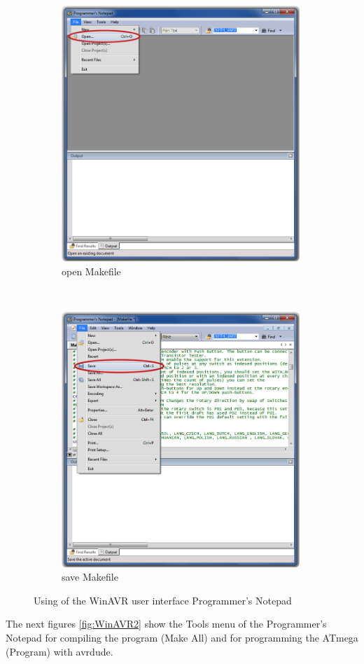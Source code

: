 \begin{figure}[H]
  \begin{subfigure}[b]{9cm}
    \centering
    \includegraphics[width=9cm]{../PNG/Notepad_open.png}
    \caption{open Makefile}
  \end{subfigure}
  ~
  \begin{subfigure}[b]{9cm}
    \centering
    \includegraphics[width=9cm]{../PNG/Notepad_save.png}
    \caption{save Makefile}
  \end{subfigure}
  \caption{Using of the WinAVR user interface Programmer's Notepad}
  \label{fig:WinAVR1}
\end{figure}

The next figures \ref{fig:WinAVR2} show the Tools menu of the Programmer's Notepad
for compiling the program (Make All) and for programming the ATmega (Program) with avrdude.

